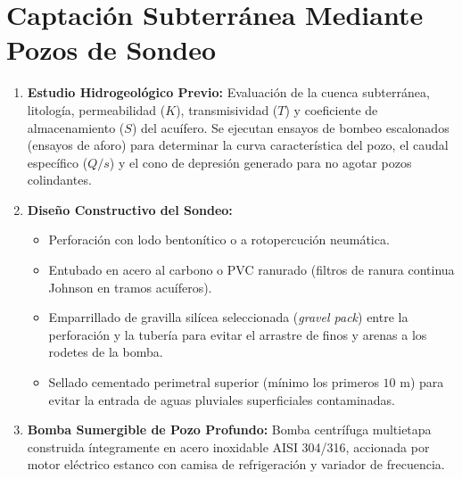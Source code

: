 \documentclass{report}
\begin{document}
\section{Captación Subterránea Mediante Pozos de Sondeo}
\begin{enumerate}
    \item \textbf{Estudio Hidrogeológico Previo:} Evaluación de la cuenca subterránea, litología, permeabilidad ($K$), transmisividad ($T$) y coeficiente de almacenamiento ($S$) del acuífero. Se ejecutan ensayos de bombeo escalonados (ensayos de aforo) para determinar la curva característica del pozo, el caudal específico ($Q/s$) y el cono de depresión generado para no agotar pozos colindantes.
    \item \textbf{Diseño Constructivo del Sondeo:}
    \begin{itemize}
        \item Perforación con lodo bentonítico o a rotopercución neumática.
        \item Entubado en acero al carbono o PVC ranurado (filtros de ranura continua Johnson en tramos acuíferos).
        \item Emparrillado de gravilla silícea seleccionada (\textit{gravel pack}) entre la perforación y la tubería para evitar el arrastre de finos y arenas a los rodetes de la bomba.
        \item Sellado cementado perimetral superior (mínimo los primeros $10\text{ m}$) para evitar la entrada de aguas pluviales superficiales contaminadas.
    \end{itemize}
    \item \textbf{Bomba Sumergible de Pozo Profundo:} Bomba centrífuga multietapa construida íntegramente en acero inoxidable AISI 304/316, accionada por motor eléctrico estanco con camisa de refrigeración y variador de frecuencia.
\end{enumerate}
\end{document}
